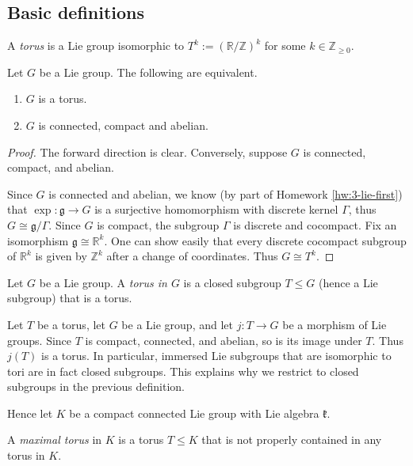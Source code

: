 \documentclass[reqno]{amsart} 
\begin{document}
\subsection{Basic definitions}
\label{sec:org2b9a950}
\begin{definition}
  A \emph{torus} is a Lie group isomorphic to $T^k := (\mathbb{R}/\mathbb{Z})^k$ for some $k \in \mathbb{Z}_{\geq 0}$.
\end{definition}
\begin{lemma}\label{lem:Characterize-tori}
  Let $G$ be a Lie group.  The following are equivalent.
  \begin{enumerate}
  \item $G$ is a torus.
  \item $G$ is connected, compact and abelian.
  \end{enumerate}
\end{lemma}
\begin{proof}
  The forward direction is clear.  Conversely, suppose $G$ is connected, compact, and abelian.

  Since $G$ is connected and abelian, we know (by part of Homework \ref{hw:3-lie-first}) that $\exp : \mathfrak{g} \rightarrow G$ is a surjective homomorphism with discrete kernel $\Gamma$, thus $G \cong \mathfrak{g} / \Gamma$.  Since $G$ is compact, the subgroup $\Gamma$ is discrete and cocompact.  Fix an isomorphism $\mathfrak{g} \cong \mathbb{R}^k$.  One can show easily that every discrete cocompact subgroup of $\mathbb{R}^k$ is given by $\mathbb{Z}^k$ after a change of coordinates.  Thus $G \cong T^k$.
\end{proof}

\begin{definition}
  Let $G$ be a Lie group.  A \emph{torus in $G$} is a closed subgroup $T \leq G$ (hence a Lie subgroup) that is a torus.
\end{definition}
\begin{remark}
  Let $T$ be a torus, let $G$ be a Lie group, and let $j : T \rightarrow G$ be a morphism of Lie groups.  Since $T$ is compact, connected, and abelian, so is its image under $T$.  Thus $j(T)$ is a torus.  In particular, immersed Lie subgroups that are isomorphic to tori are in fact closed subgroups.  This explains why we restrict to closed subgroups in the previous definition.
\end{remark}

Hence let $K$ be a compact connected Lie group with Lie algebra $\mathfrak{k}$.

\begin{definition}
  A \emph{maximal torus} in $K$ is a torus $T \leq K$ that is not properly contained in any torus in $K$.
\end{definition}
\end{document}
